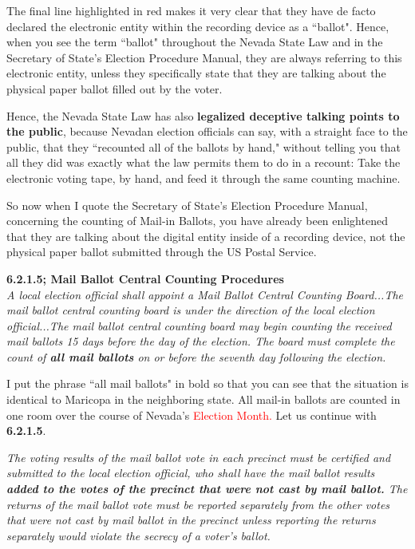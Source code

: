 The final line highlighted in red makes it very clear that they have de facto declared the electronic entity within the recording device as a ``ballot". Hence, when you see the term ``ballot" throughout the Nevada State Law and in the Secretary of State's Election Procedure Manual, they are always referring to this electronic entity, unless they specifically state that they are talking about the physical paper ballot filled out by the voter.

Hence, the Nevada State Law has also \textbf{legalized deceptive talking points to the public}, because Nevadan election officials can say, with a straight face to the public, that they ``recounted all of the ballots by hand," without telling you that all they did was exactly what the law permits them to do in a recount: Take the electronic voting tape, by hand, and feed it through the same counting machine.

So now when I quote the Secretary of State's Election Procedure Manual, concerning the counting of Mail-in Ballots, you have already been enlightened that they are talking about the digital entity inside of a recording device, not the physical paper ballot submitted through the US Postal Service.

\textbf{6.2.1.5; Mail Ballot Central Counting Procedures}\\
\textit{A local election official shall appoint a Mail Ballot Central Counting Board...The mail ballot central counting board is under the direction of the local
election official...The mail ballot central counting board may begin counting the received mail ballots 15 days before the day of the election. The board must complete the count of \textbf{all mail ballots} on or before the seventh day following the
election.}

I put the phrase ``all mail ballots" in bold so that you can see that the situation is identical to Maricopa in the neighboring state. All mail-in ballots are counted in one room over the course of Nevada's \textcolor{red}{Election Month.} Let us continue with \textbf{6.2.1.5}.

\textit{The voting results of the mail ballot vote in each precinct must be certified and submitted to the local election official, who shall have the mail ballot results \textbf{added to the votes of the precinct that were not cast by mail ballot.} The returns of the mail ballot vote must be reported separately from the other votes that were not cast by mail ballot in the precinct unless reporting the returns separately would violate the secrecy of a voter’s
ballot.}

